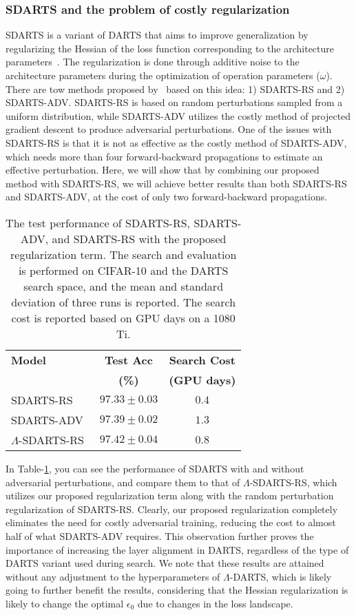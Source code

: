 \documentclass{article} \usepackage{fancyhdr, iclr2023_conference, times}
\newcommand{\mydarts}{$\Lambda$-DARTS\xspace}
\newcommand{\lambdafn}{layer alignment\xspace}
\begin{document}
\subsubsection{SDARTS and the problem of costly regularization}
\par SDARTS is a variant of DARTS that aims to improve generalization by regularizing the Hessian of the loss function corresponding to the architecture parameters~\citep{DBLP:conf/icml/ChenH20}. The regularization is done through additive noise to the architecture parameters during the optimization of operation parameters ($\omega$). There are tow methods proposed by~\citep{DBLP:conf/icml/ChenH20} based on this idea: 1) SDARTS-RS and 2) SDARTS-ADV. SDARTS-RS is based on random perturbations sampled from a uniform distribution, while SDARTS-ADV utilizes the costly method of projected gradient descent to produce adversarial perturbations. One of the issues with SDARTS-RS is that it is not as effective as the costly method of SDARTS-ADV, which needs more than four forward-backward propagations to estimate an effective perturbation. Here, we will show that by combining our proposed method with SDARTS-RS, we will achieve better results than both SDARTS-RS and SDARTS-ADV, at the cost of only two forward-backward propagations.
\par \begin{table}[t]
\centering
\caption{The test performance of SDARTS-RS, SDARTS-ADV, and SDARTS-RS with the proposed regularization term. The search and evaluation is performed on CIFAR-10 and the DARTS search space, and the mean and standard deviation of three runs is reported. The search cost is reported based on GPU days on a 1080 Ti.} 
\label{table:sdarts}
\begin{tabular}{l|c|c}
\textbf{Model} &\textbf{Test Acc} & \textbf{Search Cost} \\ 
& \textbf{(\%)} & \textbf{(GPU days)} \\\hline
    SDARTS-RS~\citep{DBLP:conf/icml/ChenH20} & $97.33\pm 0.03$ & $0.4$\\
    SDARTS-ADV~\citep{DBLP:journals/ijcv/ChenXWT21} & $97.39\pm 0.02$ & $1.3$\\\hline
    $\Lambda$-SDARTS-RS & $\mathbf{97.42\pm 0.04}$ & $0.8$
\end{tabular}
\end{table} In Table-\ref{table:sdarts}, you can see the performance of SDARTS with and without adversarial perturbations, and compare them to that of $\Lambda$-SDARTS-RS, which utilizes our proposed regularization term along with the random perturbation regularization of SDARTS-RS. Clearly, our proposed regularization completely eliminates the need for costly adversarial training, reducing the cost to almost half of what SDARTS-ADV requires. This observation further proves the importance of increasing the \lambdafn in DARTS, regardless of the type of DARTS variant used during search. We note that these results are attained without any adjustment to the hyperparameters of \mydarts, which is likely going to further benefit the results, considering that the Hessian regularization is likely to change the optimal $\epsilon_0$ due to changes in the loss landscape.
\end{document}
